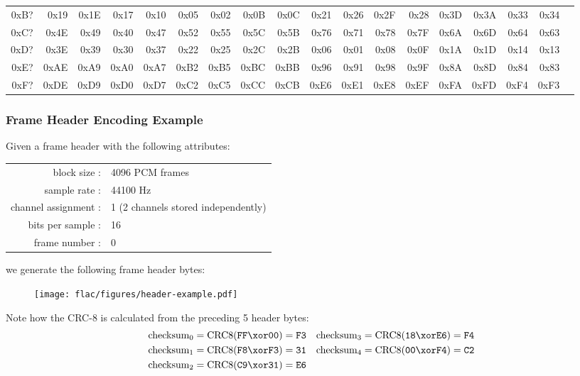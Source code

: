 \begin{table}[h]
{\begin{tabular}{|r||r|r|r|r|r|r|r|r|r|r|r|r|r|r|r|r|r|}
0xB? & 0x19 & 0x1E & 0x17 & 0x10 & 0x05 & 0x02 & 0x0B & 0x0C & 0x21 & 0x26 & 0x2F & 0x28 & 0x3D & 0x3A & 0x33 & 0x34 \\
0xC? & 0x4E & 0x49 & 0x40 & 0x47 & 0x52 & 0x55 & 0x5C & 0x5B & 0x76 & 0x71 & 0x78 & 0x7F & 0x6A & 0x6D & 0x64 & 0x63 \\
0xD? & 0x3E & 0x39 & 0x30 & 0x37 & 0x22 & 0x25 & 0x2C & 0x2B & 0x06 & 0x01 & 0x08 & 0x0F & 0x1A & 0x1D & 0x14 & 0x13 \\
0xE? & 0xAE & 0xA9 & 0xA0 & 0xA7 & 0xB2 & 0xB5 & 0xBC & 0xBB & 0x96 & 0x91 & 0x98 & 0x9F & 0x8A & 0x8D & 0x84 & 0x83 \\
0xF? & 0xDE & 0xD9 & 0xD0 & 0xD7 & 0xC2 & 0xC5 & 0xCC & 0xCB & 0xE6 & 0xE1 & 0xE8 & 0xEF & 0xFA & 0xFD & 0xF4 & 0xF3 \\
\hline
\end{tabular}
}
\end{table}

\subsubsection{Frame Header Encoding Example}
Given a frame header with the following attributes:
\begin{table}[h]
\begin{tabular}{rl}
block size : & 4096 PCM frames \\
sample rate : & 44100 Hz \\
channel assignment : & 1 (2 channels stored independently) \\
bits per sample : & 16 \\
frame number : & 0
\end{tabular}
\end{table}
\par
\noindent
we generate the following frame header bytes:
\begin{figure}[h]
\texttt{[image: flac/figures/header-example.pdf]}
\end{figure}
\par
\noindent
Note how the CRC-8 is calculated from the preceding 5 header bytes:
\begin{align*}
\text{checksum}_0 = \text{CRC8}(\texttt{FF}\xor\texttt{00}) = \texttt{F3} & &
\text{checksum}_3 = \text{CRC8}(\texttt{18}\xor\texttt{E6}) = \texttt{F4} \\
\text{checksum}_1 = \text{CRC8}(\texttt{F8}\xor\texttt{F3}) = \texttt{31} & &
\text{checksum}_4 = \text{CRC8}(\texttt{00}\xor\texttt{F4}) = \texttt{C2} \\
\text{checksum}_2 = \text{CRC8}(\texttt{C9}\xor\texttt{31}) = \texttt{E6} \\
\end{align*}

